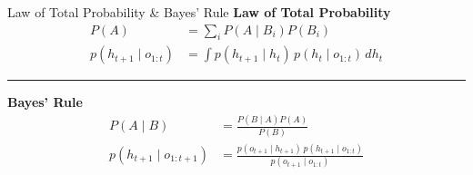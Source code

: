 \documentclass[18pt,aspectratio=149]{beamer}
\begin{document}
\begin{frame}{Law of Total Probability \& Bayes' Rule}
    \textbf{Law of Total Probability}
    \begin{align*}
        P(A)                    & = \sum_{i} P(A \mid B_i) P(B_i)                           \\
        p(h_{t+1} \mid o_{1:t}) & = \int p(h_{t+1} \mid h_t) \, p(h_t \mid o_{1:t}) \, dh_t
    \end{align*}

    \vspace{0.4em}
    \hrule
    \vspace{0.6em}

    \textbf{Bayes' Rule}
    \begin{align*}
        P(A \mid B)               & = \frac{P(B \mid A) P(A)}{P(B)}                                                      \\
        p(h_{t+1} \mid o_{1:t+1}) & = \frac{p(o_{t+1} \mid h_{t+1}) \, p(h_{t+1} \mid o_{1:t})}{p(o_{t+1} \mid o_{1:t})}
    \end{align*}
\end{frame}
\end{document}
